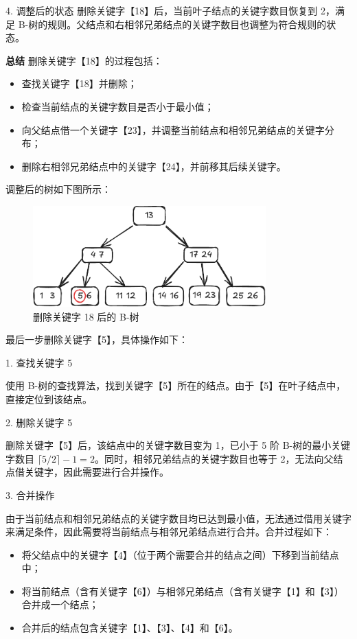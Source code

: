 \documentclass[lang=cn,newtx,10pt,scheme=chinese]{elegantbook}
\begin{document}
     4. 调整后的状态  
        删除关键字【18】后，当前叶子结点的关键字数目恢复到 2，满足 B-树的规则。父结点和右相邻兄弟结点的关键字数目也调整为符合规则的状态。
     
     
     \textbf{总结}  
     删除关键字【18】的过程包括：
     \begin{itemize}
       \item 查找关键字【18】并删除；
       \item 检查当前结点的关键字数目是否小于最小值；
       \item 向父结点借一个关键字【23】，并调整当前结点和相邻兄弟结点的关键字分布；
       \item 删除右相邻兄弟结点中的关键字【24】，并前移其后续关键字。
     \end{itemize}

     调整后的树如下图所示：
      \begin{figure}[h!]
          
            \centering
            \includegraphics[width=0.8\textwidth]{./figure/pdf/cropped/Btree_del4.pdf}
            \caption{删除关键字 18 后的 B-树}
            \label{fig:Btree_delete_18}

      \end{figure}

      最后一步删除关键字【5】，具体操作如下：

      1. 查找关键字 5  

         使用 B-树的查找算法，找到关键字【5】所在的结点。由于【5】在叶子结点中，直接定位到该结点。
      
      2. 删除关键字 5  

         删除关键字【5】后，该结点中的关键字数目变为 1，已小于 5 阶 B-树的最小关键字数目 $\lceil 5/2 \rceil - 1 = 2$。同时，相邻兄弟结点的关键字数目也等于 2，无法向父结点借关键字，因此需要进行合并操作。
      
      3. 合并操作  

         由于当前结点和相邻兄弟结点的关键字数目均已达到最小值，无法通过借用关键字来满足条件，因此需要将当前结点与相邻兄弟结点进行合并。合并过程如下：
         \begin{itemize}
           \item 将父结点中的关键字【4】（位于两个需要合并的结点之间）下移到当前结点中；
           \item 将当前结点（含有关键字【6】）与相邻兄弟结点（含有关键字【1】和【3】）合并成一个结点；
           \item 合并后的结点包含关键字【1】、【3】、【4】和【6】。
         \end{itemize}
      
\end{document}
